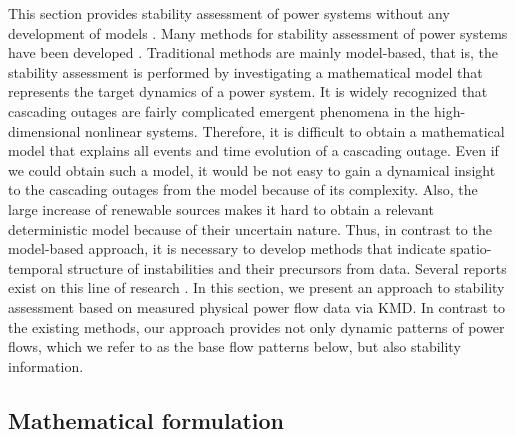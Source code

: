 \documentclass[a4paper,10pt]{article}
\begin{document}
This section provides stability assessment of power systems without any development of models \cite{Susuki_IEEETPWRS29}.  
Many methods for stability assessment of power systems have been developed \cite{Machowski:1997}.  
Traditional methods are mainly model-based, that is, the stability assessment is performed by investigating a mathematical model that represents the target dynamics of a power system.  
It is widely recognized that cascading outages are fairly complicated emergent phenomena in the high-dimensional nonlinear systems.  
Therefore, it is difficult to obtain a mathematical model that explains all events and time evolution of a cascading outage.  
Even if we could obtain such a model, it would be not easy to gain a dynamical insight to the cascading outages from the model because of its complexity.  
Also, the large increase of renewable sources makes it hard to obtain a relevant deterministic model because of their uncertain nature.    
Thus, in contrast to the model-based approach, it is necessary to develop methods that indicate spatio-temporal structure of instabilities and their precursors from data.  
Several reports exist on this line of research \cite{Ostojic_IEEETPS8,Messina_IEEETPS21,Messina_IEEETPS22}.  
In this section, we present an approach to stability assessment based on measured physical power flow data via KMD.  
In contrast to the existing methods, our approach provides not only dynamic patterns of power flows, which we refer to as the base flow patterns below, but also stability information.  


\subsection{Mathematical formulation}
\label{subsec:stability-math}
\end{document}
